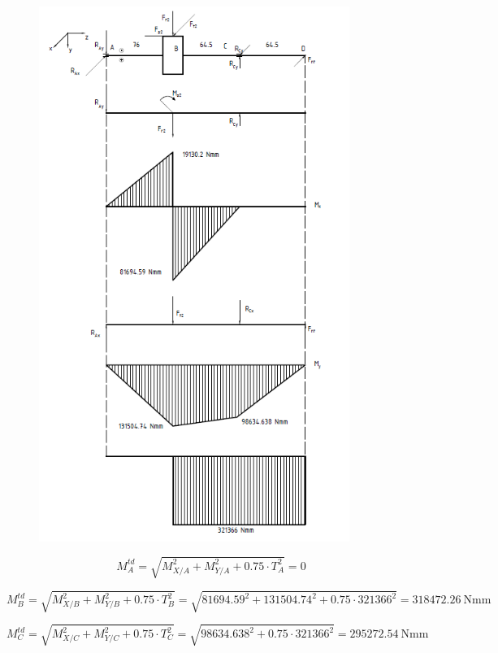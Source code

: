 \begin{figure}[H]
    \centering
    \includegraphics[width=0.9\textwidth]{pictures/momen2.png}
\end{figure}
\[
    M_A^{td} 
    = \sqrt{M_{X/A}^2 + M_{Y/A}^2 + 0.75 \cdot T_A^2} 
    = 0
\]

\[
    M_B^{td} 
    = \sqrt{M_{X/B}^2 + M_{Y/B}^2 + 0.75 \cdot T_B^2} 
    = \sqrt{81694.59^2 + 131504.74^2 + 0.75 \cdot 321366^2} 
    = 318472.26\ \text{Nmm}
\]

\[
    M_C^{td} 
    = \sqrt{M_{X/C}^2 + M_{Y/C}^2 + 0.75 \cdot T_C^2} 
    = \sqrt{98634.638^2 + 0.75 \cdot 321366^2} 
    = 295272.54\ \text{Nmm}
\]

